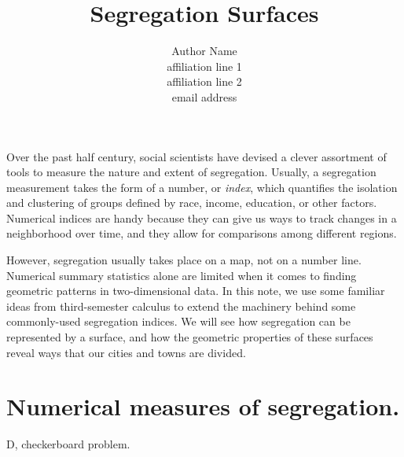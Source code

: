 \documentclass{article}
\theoremstyle{theorem}
\theoremstyle{definition}
\begin{document}
\title{Segregation Surfaces}

\author{Author Name\\               %
\scriptsize affiliation line 1\\    %
affiliation line 2\\                %
email address}                      %

\maketitle

\noindent Over the past half century, social scientists have devised a clever assortment of tools to measure the nature and extent of segregation. \cite{harrisjohnson18} Usually, a segregation measurement takes the form of a number, or \textit{index}, which quantifies the isolation and clustering of groups defined by race, income, education, or other factors. Numerical indices are handy because they can give us ways to track changes in a neighborhood over time, and they allow for comparisons among different regions.

However, segregation usually takes place on a map, not on a number line. Numerical summary statistics alone are limited when it comes to finding geometric patterns in two-dimensional data. In this note, we use some familiar ideas from third-semester calculus to extend the machinery behind some commonly-used segregation indices. We will see how segregation can be represented by a surface, and how the geometric properties of these surfaces reveal ways that our cities and towns are divided.

\section{Numerical measures of segregation.}

D, checkerboard problem.
\end{document}
